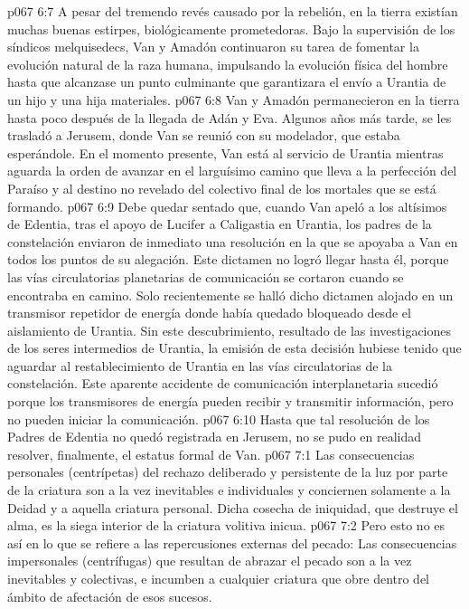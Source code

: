 \vs p067 6:7 A pesar del tremendo revés causado por la rebelión, en la tierra existían muchas buenas estirpes, biológicamente prometedoras. Bajo la supervisión de los síndicos melquisedecs, Van y Amadón continuaron su tarea de fomentar la evolución natural de la raza humana, impulsando la evolución física del hombre hasta que alcanzase un punto culminante que garantizara el envío a Urantia de un hijo y una hija materiales.
\vs p067 6:8 \pc Van y Amadón permanecieron en la tierra hasta poco después de la llegada de Adán y Eva. Algunos años más tarde, se les trasladó a Jerusem, donde Van se reunió con su modelador, que estaba esperándole. En el momento presente, Van está al servicio de Urantia mientras aguarda la orden de avanzar en el larguísimo camino que lleva a la perfección del Paraíso y al destino no revelado del colectivo final de los mortales que se está formando.
\vs p067 6:9 \pc Debe quedar sentado que, cuando Van apeló a los altísimos de Edentia, tras el apoyo de Lucifer a Caligastia en Urantia, los padres de la constelación enviaron de inmediato una resolución en la que se apoyaba a Van en todos los puntos de su alegación. Este dictamen no logró llegar hasta él, porque las vías circulatorias planetarias de comunicación se cortaron cuando se encontraba en camino. Solo recientemente se halló dicho dictamen alojado en un transmisor repetidor de energía donde había quedado bloqueado desde el aislamiento de Urantia. Sin este descubrimiento, resultado de las investigaciones de los seres intermedios de Urantia, la emisión de esta decisión hubiese tenido que aguardar al restablecimiento de Urantia en las vías circulatorias de la constelación. Este aparente accidente de comunicación interplanetaria sucedió porque los transmisores de energía pueden recibir y transmitir información, pero no pueden iniciar la comunicación.
\vs p067 6:10 Hasta que tal resolución de los Padres de Edentia no quedó registrada en Jerusem, no se pudo en realidad resolver, finalmente, el estatus formal de Van.
\vs p067 7:1 Las consecuencias personales (centrípetas) del rechazo deliberado y persistente de la luz por parte de la criatura son a la vez inevitables e individuales y conciernen solamente a la Deidad y a aquella criatura personal. Dicha cosecha de iniquidad, que destruye el alma, es la siega interior de la criatura volitiva inicua.
\vs p067 7:2 Pero esto no es así en lo que se refiere a las repercusiones externas del pecado: Las consecuencias impersonales (centrífugas) que resultan de abrazar el pecado son a la vez inevitables y colectivas, e incumben a cualquier criatura que obre dentro del ámbito de afectación de esos sucesos.
